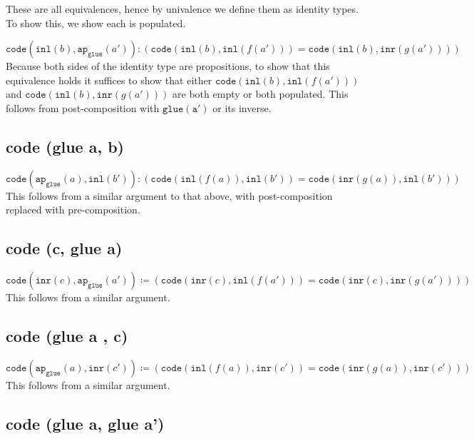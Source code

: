 \message{ !name(notes.tex)}\documentclass[12pt]{amsart}
\newcommand{\type}[1]{\mathtt{#1}}
\newcommand{\inl}{\type{inl}}
\newcommand{\inr}{\type{inr}}
\theoremstyle{remark}
\theoremstyle{definition}
\begin{document}
These are all equivalences, hence by univalence
we define them as identity types. 
To show this, we show each is populated.

	$ 
	\type{ code } \left( \inl( b ) , \type{ ap }_{ \type{ glue } } ( a' ) \right) \colon \left( \type{ code } ( \inl( b ) , \inl( f ( a' ) ) ) = \type{ code } ( \inl( b ) , \inr( g ( a' ) ) ) \right) 
	$
	Because both sides of the identity type are propositions,
	to show that this equivalence holds
	it suffices to show that either
	$\type{ code } ( \inl( b ) , \inl( f ( a' ) ) )$
	and
	$\type{ code } ( \inl( b ) , \inr( g ( a' ) ) )$
	are both empty or both populated.
	This follows from post-composition with
	$ \type{ glue ( a' ) }$
	or its inverse.	

\pagebreak
\subsection*{code (glue a, b)}

	$ 
	\type{ code } \left( \type{ ap }_{ \type{ glue } } ( a ) , \inl( b' ) \right) \colon
	\left(
	\type{ code } ( \inl( f ( a ) ) , \inl( b' ) ) =
	\type{ code } ( \inr( g ( a ) ), \inl( b' ) ) 
	\right)
	$
	This follows from a similar argument to that above, 
	with post-composition replaced with pre-composition.

\pagebreak
\subsection*{code (c, glue a)}

	$ 
	\type{ code } \left( \inr( c ) , \type{ ap }_{ \type{ glue } } ( a' ) \right) \coloneqq
	\left( 
	\type{ code } ( \inr( c ) , \inl( f ( a' ) ) ) =
	\type{ code } ( \inr( c ) , \inr( g ( a' ) ) ) 
	\right) 
	$ 
	This follows from a similar argument.	

\pagebreak
\subsection*{code (glue a , c)}

	$ 
	\type{ code } \left( \type{ ap }_{ \type{ glue } } ( a ) , \inr( c' ) \right) \coloneqq 
	\left( 
	\type{ code } ( \inl( f ( a ) ) , \inr( c' ) ) =
	\type{ code } ( \inr( g ( a ) ) , \inr( c' ) ) 
	\right) 
	$ 
	This follows from a similar argument.	

\pagebreak
\subsection*{code (glue a, glue a')}
\end{document}
